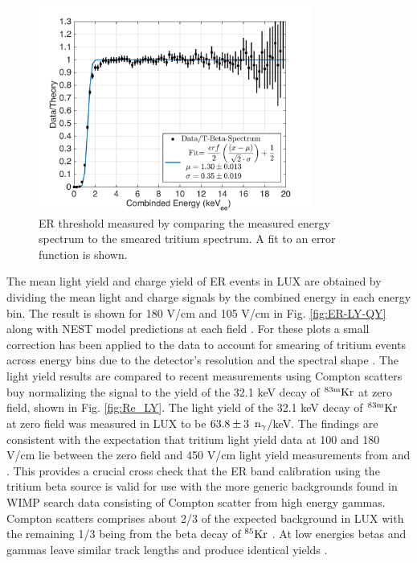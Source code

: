 \begin{figure}[h!]\centering
\includegraphics[width=90mm]{fig/E_Thres_Fit.png}
\caption{ER threshold measured by comparing the measured energy spectrum to the smeared tritium spectrum. A fit to an error function is shown.}
\label{fig:ER-threshold}
\end{figure}

The mean light yield and charge yield of ER events in LUX are obtained by dividing the mean light and charge signals by the combined energy in each energy bin. The result is shown for 180 V/cm and 105 V/cm in Fig. \ref{fig:ER-LY-QY} along with NEST model predictions at each field \cite{NEST_2013}. For these plots a small correction has been applied to the data to account for smearing of tritium events across energy bins due to the detector's resolution and the spectral shape \cite{Dobi_Thesis}. 
The light yield results are compared to recent measurements using Compton scatters buy normalizing the signal to the yield of the 32.1 keV decay of $\rm ^{83m}Kr$ at zero field, shown in Fig. \ref{fig:Re_LY}. The light yield of the 32.1 keV decay of $\rm ^{83m}Kr$ at zero field was measured in LUX to be $\rm 63.8 \pm 3$ $\rm n_\gamma$/keV.  The findings are consistent with the expectation that tritium light yield data at 100 and 180 V/cm lie between the zero field and 450 V/cm light yield measurements from \cite{Aprile_LY} and \cite{Baudis}. This provides a crucial cross check that the ER band calibration using the tritium beta source is valid for use with the more generic backgrounds found in WIMP search data consisting of Compton scatter from high energy gammas. Compton scatters comprises about 2/3 of the expected background in LUX with the remaining 1/3 being from the beta decay of $\rm ^{85}Kr$ \cite{LUX_BG}. At low energies betas and gammas leave similar track lengths and produce identical yields \cite{NEST} \cite{NEST_2013}. 

